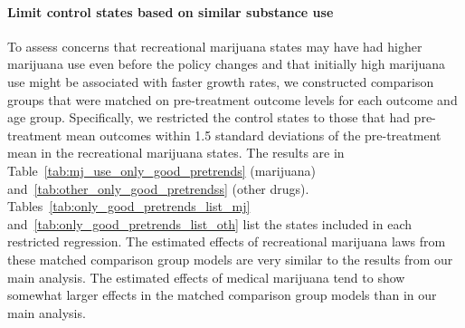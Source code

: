 \documentclass[12pt]{article}%
\begin{document}
\paragraph{Limit control states based on similar substance use}
To assess concerns that recreational marijuana states may have had higher marijuana use even before the policy changes and that initially high marijuana use might be associated with faster growth rates, we constructed comparison groups that were matched on pre-treatment outcome levels for each outcome and age group. Specifically, we restricted the control states to those that had pre-treatment mean outcomes within 1.5 standard deviations of the pre-treatment mean in the recreational marijuana states. The results are in Table~\ref{tab:mj_use_only_good_pretrends} (marijuana) and~\ref{tab:other_only_good_pretrendss} (other drugs). Tables~\ref{tab:only_good_pretrends_list_mj} and~\ref{tab:only_good_pretrends_list_oth} list the states included in each restricted regression. The estimated effects of recreational marijuana laws from these matched comparison group models are very similar to the results from our main analysis. The estimated effects of medical marijuana tend to show somewhat larger effects in the matched comparison group models than in our main analysis.

\end{document}
